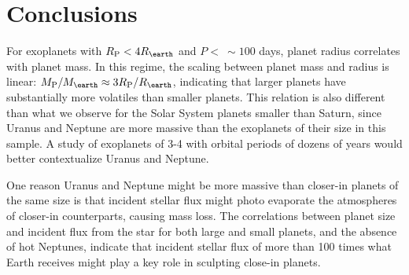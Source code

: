 \documentclass[11pt]{aastex}
\newcommand{\rspecial}{4 \rearth}
\begin{document}
\section{Conclusions}
For exoplanets with $\rpl < \rspecial$ and $P < ~\sim100$ days, planet radius correlates with planet mass.  In this regime, the scaling between planet mass and radius is linear: $\mpl/\mearth \approx 3\rpl/\rearth$, indicating that larger planets have substantially more volatiles than smaller planets.  This relation is also different than what we observe for the Solar System planets smaller than Saturn, since Uranus and Neptune are more massive than the exoplanets of their size in this sample.  A study of exoplanets of 3-4 \rearth with orbital periods of dozens of years would better contextualize Uranus and Neptune.

One reason Uranus and Neptune might be more massive than closer-in planets of the same size is that incident stellar flux might photo evaporate the atmospheres of closer-in counterparts, causing mass loss.  The correlations between planet size and incident flux from the star for both large and small planets, and the absence of hot Neptunes, indicate that incident stellar flux of more than 100 times what Earth receives might play a key role in sculpting close-in planets.
\end{document}
